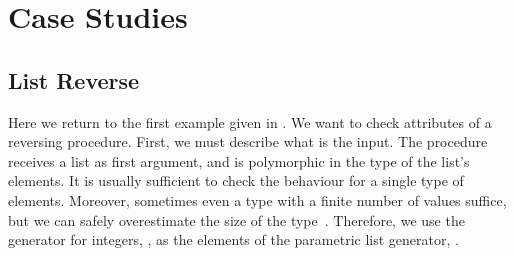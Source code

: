 
\section{Case Studies}
\label{sec:case-studies}




\subsection{List Reverse}

Here we return to the first example given in .
%
%
%
We want to check attributes of a reversing procedure.
%
First, we must describe what is the input.
%
The procedure receives a list as first argument, and is polymorphic in
the type of the list's elements.
It is usually sufficient to check the behaviour for a
single type of elements.
%
Moreover, sometimes even a type with a finite number of values suffice,
but we can safely overestimate the size of the
type~\cite{Bernardy-testing-poly-prop}.
%
%
Therefore, we use the generator for integers, , as the elements
of the parametric list generator, .



